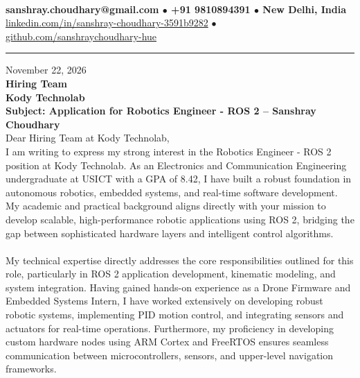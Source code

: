\documentclass[10pt,a4paper]{article}%
\begin{document}
%
 \vspace{3pt}\\%
\noindent \textbf{\footnotesize sanshray.choudhary@gmail.com $\bullet$ +91 9810894391 $\bullet$ New Delhi, India}\\%
\noindent \href{https://www.linkedin.com/in/sanshray-choudhary-3591b9282}{linkedin.com/in/sanshray-choudhary-3591b9282} $\bullet$ \href{https://github.com/sanshraychoudhary-hue}{github.com/sanshraychoudhary-hue} \vspace{12pt}%
\hrule \vspace{18pt}%

\noindent November 22, 2026 \vspace{12pt}\\%
\noindent \textbf{Hiring Team} \\%
\noindent \textbf{Kody Technolab} \vspace{16pt}\\%

\noindent \textbf{Subject: Application for Robotics Engineer - ROS 2 -- Sanshray Choudhary} \vspace{12pt}\\%

\noindent Dear Hiring Team at Kody Technolab, \vspace{8pt}\\%

\noindent I am writing to express my strong interest in the Robotics Engineer - ROS 2 position at Kody Technolab. As an Electronics and Communication Engineering undergraduate at USICT with a GPA of 8.42, I have built a robust foundation in autonomous robotics, embedded systems, and real-time software development. My academic and practical background aligns directly with your mission to develop scalable, high-performance robotic applications using ROS 2, bridging the gap between sophisticated hardware layers and intelligent control algorithms. \vspace{8pt}\\

\noindent \vspace{8pt}\\

\noindent My technical expertise directly addresses the core responsibilities outlined for this role, particularly in ROS 2 application development, kinematic modeling, and system integration. Having gained hands-on experience as a Drone Firmware and Embedded Systems Intern, I have worked extensively on developing robust robotic systems, implementing PID motion control, and integrating sensors and actuators for real-time operations. Furthermore, my proficiency in developing custom hardware nodes using ARM Cortex and FreeRTOS ensures seamless communication between microcontrollers, sensors, and upper-level navigation frameworks. \vspace{8pt}\\
\end{document}
